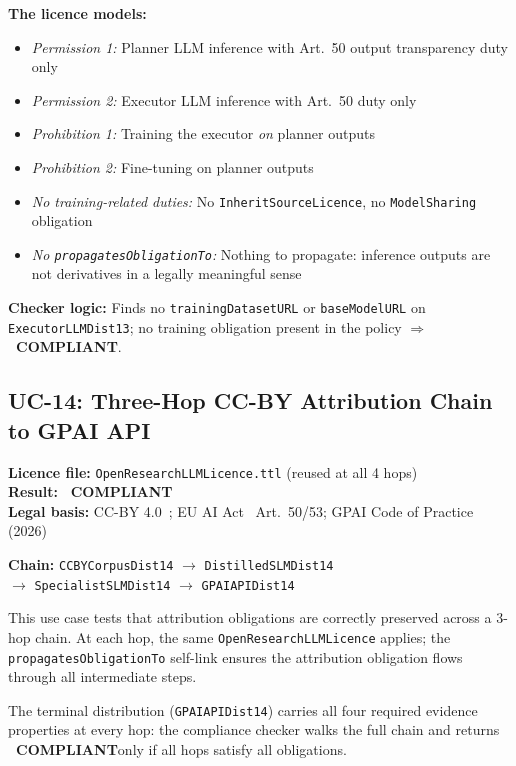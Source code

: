 \documentclass[12pt,a4paper]{article}
\newcommand{\compliant}{\textcolor{compliant}{\textbf{\checkmark\ COMPLIANT}}}
\begin{document}
\textbf{The licence models:}
\begin{itemize}[noitemsep]
  \item \emph{Permission 1:} Planner LLM inference with Art.\ 50 output transparency duty only
  \item \emph{Permission 2:} Executor LLM inference with Art.\ 50 duty only
  \item \emph{Prohibition 1:} Training the executor \emph{on} planner outputs
  \item \emph{Prohibition 2:} Fine-tuning on planner outputs
  \item \emph{No training-related duties:} No \texttt{InheritSourceLicence}, no \texttt{ModelSharing} obligation
  \item \emph{No \texttt{propagatesObligationTo}:} Nothing to propagate: inference outputs are not derivatives in a legally meaningful sense
\end{itemize}

\textbf{Checker logic:} Finds no \texttt{trainingDatasetURL} or \texttt{baseModelURL} on \texttt{ExecutorLLMDist13}; no training obligation present in the policy $\Rightarrow$ \compliant.

\subsection{UC-14: Three-Hop CC-BY Attribution Chain to GPAI API}
\textbf{Licence file:} \texttt{OpenResearchLLMLicence.ttl} (reused at all 4 hops)\\
\textbf{Result:} \compliant\\[4pt]
\textbf{Legal basis:} CC-BY 4.0~\cite{ccby40}; EU AI Act~\cite{euaiact2024} Art.\ 50/53; GPAI Code of Practice (2026)

\textbf{Chain:} \texttt{CCBYCorpusDist14} $\rightarrow$ \texttt{DistilledSLMDist14}\\
\quad$\rightarrow$ \texttt{SpecialistSLMDist14} $\rightarrow$ \texttt{GPAIAPIDist14}

This use case tests that attribution obligations are correctly preserved across a 3-hop chain. At each hop, the same \texttt{OpenResearchLLMLicence} applies; the \texttt{propagatesObligationTo} self-link ensures the attribution obligation flows through all intermediate steps.

The terminal distribution (\texttt{GPAIAPIDist14}) carries all four required evidence properties at every hop: the compliance checker walks the full chain and returns \compliant only if all hops satisfy all obligations.
\end{document}
